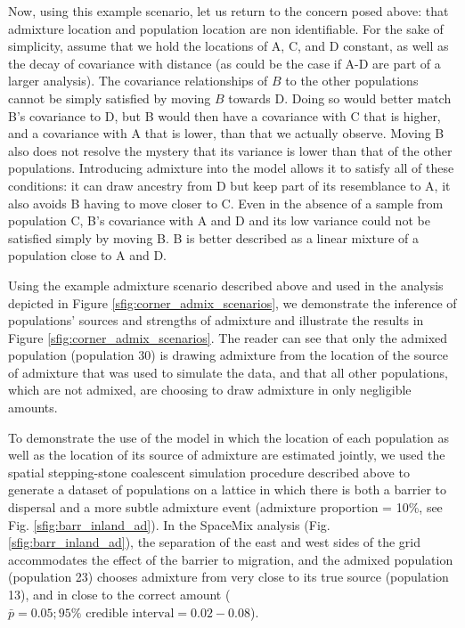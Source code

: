 \documentclass[12pt]{article}
\begin{document}
Now, using this example scenario, let us return to the concern posed above: that admixture location and population location are non identifiable.  For the sake of simplicity, assume that we hold the locations of A, C, and D constant, as well as the decay of covariance with distance (as could be the case if A-D are part of a larger analysis).  The covariance relationships of $B$ to the other populations cannot be simply satisfied by moving $B$ towards D. Doing so would better match B's covariance to D, but B would then have a covariance with C that is higher, and a covariance with A that is lower, than that we actually observe. Moving B also does not resolve the mystery that its variance is lower than that of the other populations. Introducing admixture into the model allows it to satisfy all of these conditions: it can draw ancestry from D but keep part of its resemblance to A, it also avoids B having to move closer to C. Even in the absence of a sample from population C, B's covariance with A and D and its low variance could not be satisfied simply by moving B.  B is better described as a linear mixture of a population close to A and D.

Using the example admixture scenario described above and used in the analysis depicted in Figure \ref{sfig:corner_admix_scenarios}, we demonstrate the inference of populations' sources and strengths of admixture and illustrate the results in Figure \ref{sfig:corner_admix_scenarios}.  The reader can see that only the admixed population (population 30) is drawing admixture from the location of the source of admixture that was used to simulate the data, and that all other populations, which are not admixed, are choosing to draw admixture in only negligible amounts.

To demonstrate the use of the model in which the location of each population as well as the location of its source of admixture are estimated jointly, we used the spatial stepping-stone coalescent simulation procedure described above to generate a dataset of populations on a lattice in which there is both a barrier to dispersal and a more subtle admixture event (admixture proportion = 10\%, see Fig. \ref{sfig:barr_inland_ad}).  In the SpaceMix analysis (Fig. \ref{sfig:barr_inland_ad}), the separation of the east and west sides of the grid accommodates the effect of the barrier to migration, and the admixed population (population 23) chooses admixture from very close to its true source (population 13), and in close to the correct amount ($\bar{p} = 0.05; 95\% \text{ credible interval} = 0.02-0.08$). 
\end{document}
